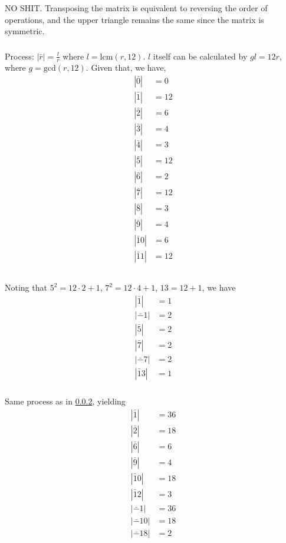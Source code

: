 \documentclass{article}
\newcommand{\abs}[1]{| #1 |}
\begin{document}
\subsubsection{}
NO SHIT. Transposing the matrix is equivalent to reversing the order of operations, and the upper triangle remains the same since the matrix is symmetric.
\subsubsection{}\label{ex11}
Process: $|\bar r| = \frac{l}{r}$ where $l = \mbox{lcm}(r,12)$. $l$ itself can be calculated by $gl = 12r$, where $g=\mbox{gcd}(r,12)$. Given that, we have,
\begin{align*}
\abs{\bar 0 } &= 0\\
\abs{\bar 1 } &= 12\\
\abs{\bar 2 } &= 6\\
\abs{\bar 3 } &= 4\\
\abs{\bar 4 } &= 3\\
\abs{\bar 5 } &= 12\\
\abs{\bar 6 } &= 2\\
\abs{\bar 7 } &= 12\\
\abs{\bar 8 } &= 3\\
\abs{\bar 9 } &= 4\\
\abs{\bar 10 } &= 6\\
\abs{\bar 11 } &= 12\\
\end{align*}
\subsubsection{}
Noting that $5^2 = 12\cdot 2 + 1$, $7^2 = 12\cdot 4+1$, $13 = 12+1$, we have
\begin{align*}
\abs{\bar 1 } &= 1\\
\abs{\bar -1 } &= 2\\
\abs{\bar 5 } &= 2\\
\abs{\bar 7 } &= 2\\
\abs{\bar -7 } &= 2\\
\abs{\bar 13 } &= 1
\end{align*}
\subsubsection{}
Same process as in \ref{ex11}, yielding
\begin{align*}
\abs{\bar 1 } &= 36\\
\abs{\bar 2 } &= 18\\
\abs{\bar 6 } &= 6\\
\abs{\bar 9 } &= 4\\
\abs{\bar 10 } &= 18\\
\abs{\bar 12 } &= 3\\
\abs{\bar -1 } &= 36\\
\abs{\bar -10 } &= 18\\
\abs{\bar -18 } &= 2\\
\end{align*}
\end{document}
